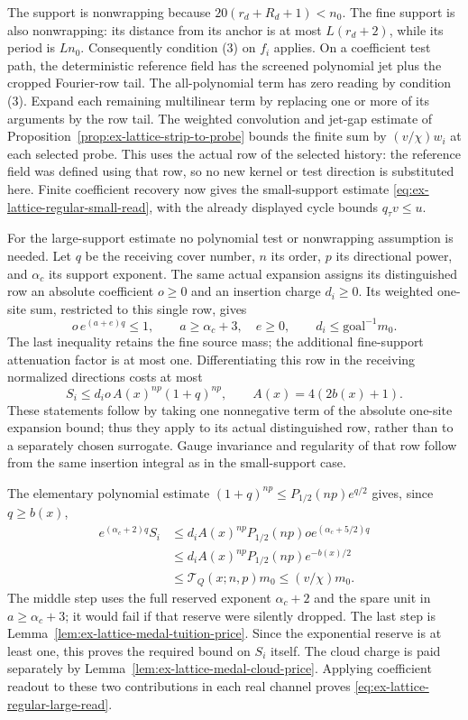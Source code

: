 The support is nonwrapping because
$20(r_d+R_d+1)<n_0$. The fine support is also nonwrapping: its distance
from its anchor is at most $L(r_d+2)$, while its period is $Ln_0$.
Consequently condition (3) on $f_i$ applies. On a coefficient test path,
the deterministic reference field has the screened polynomial jet plus
the cropped Fourier-row tail. The all-polynomial term has zero reading
by condition (3). Expand each remaining multilinear term by replacing
one or more of its arguments by the row tail. The weighted convolution
and jet-gap estimate of
Proposition~\ref{prop:ex-lattice-strip-to-probe} bounds the finite sum by
$(v/\chi)w_i$ at each selected probe. This uses the actual row of the
selected history: the reference field was defined using that row, so no
new kernel or test direction is substituted here. Finite coefficient
recovery now gives the small-support estimate
\eqref{eq:ex-lattice-regular-small-read}, with the already displayed
cycle bounds $q_\tau v\le u$.

For the large-support estimate no polynomial test or nonwrapping
assumption is needed. Let $q$ be the receiving cover number, $n$ its
order, $p$ its directional power, and $\alpha_c$ its support exponent.
The same actual expansion assigns its distinguished row an absolute
coefficient $o\ge0$ and an insertion charge $d_i\ge0$. Its weighted
one-site sum, restricted to this single row, gives
\[
 o\,e^{(a+e)q}\le1,\qquad
 a\ge\alpha_c+3,\quad e\ge0,\qquad
 d_i\le\mathrm{goal}^{-1}m_0.
\]
The last inequality retains the fine source mass; the additional
fine-support attenuation factor is at most one. Differentiating this
row in the receiving normalized directions costs at most
\[
 S_i\le d_i o\,A(x)^{np}(1+q)^{np},
 \qquad A(x)=4(2b(x)+1).
\]
These statements follow by taking one nonnegative term of the absolute
one-site expansion bound; thus they apply to its actual distinguished
row, rather than to a separately chosen surrogate. Gauge invariance and
regularity of that row follow from the same insertion integral as in the
small-support case.

The elementary polynomial estimate
$(1+q)^{np}\le P_{1/2}(np)e^{q/2}$ gives, since $q\ge b(x)$,
\begin{align*}
 e^{(\alpha_c+2)q} S_i
 &\le d_i A(x)^{np}P_{1/2}(np)
       o e^{(\alpha_c+5/2)q}\\
 &\le d_i A(x)^{np}P_{1/2}(np)e^{-b(x)/2}\\
 &\le \mathcal T_Q(x;n,p)m_0\le(v/\chi)m_0.
\end{align*}
The middle step uses the full reserved exponent $\alpha_c+2$ and the
spare unit in $a\ge\alpha_c+3$; it would fail if that reserve were
silently dropped. The last step is
Lemma~\ref{lem:ex-lattice-medal-tuition-price}. Since the exponential
reserve is at least one, this proves the required bound on $S_i$ itself.
The cloud charge is paid separately by
Lemma~\ref{lem:ex-lattice-medal-cloud-price}. Applying coefficient
readout to these two contributions in each real channel proves
\eqref{eq:ex-lattice-regular-large-read}.


